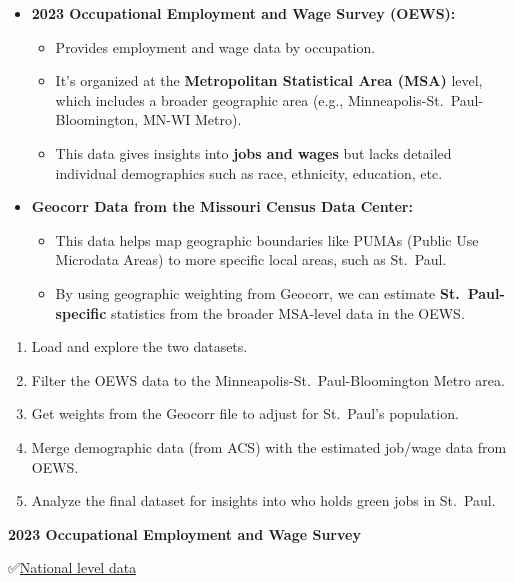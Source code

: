 \documentclass[
  letterpaper,
  DIV=11,
  numbers=noendperiod]{scrartcl}
\providecommand{\tightlist}{%
  \setlength{\itemsep}{0pt}\setlength{\parskip}{0pt}}\usepackage{longtable,booktabs,array}
\begin{document}
\begin{itemize}
\item
  \textbf{2023 Occupational Employment and Wage Survey (OEWS):}

  \begin{itemize}
  \item
    Provides employment and wage data by occupation.
  \item
    It's organized at the \textbf{Metropolitan Statistical Area (MSA)}
    level, which includes a broader geographic area (e.g.,
    Minneapolis-St.~Paul-Bloomington, MN-WI Metro).
  \item
    This data gives insights into \textbf{jobs and wages} but lacks
    detailed individual demographics such as race, ethnicity, education,
    etc.
  \end{itemize}
\item
  \textbf{Geocorr Data from the Missouri Census Data Center:}

  \begin{itemize}
  \item
    This data helps map geographic boundaries like PUMAs (Public Use
    Microdata Areas) to more specific local areas, such as St.~Paul.
  \item
    By using geographic weighting from Geocorr, we can estimate
    \textbf{St.~Paul-specific} statistics from the broader MSA-level
    data in the OEWS.
  \end{itemize}
\end{itemize}

\begin{enumerate}
\def\labelenumi{\arabic{enumi}.}
\tightlist
\item
  Load and explore the two datasets.
\item
  Filter the OEWS data to the Minneapolis-St.~Paul-Bloomington Metro
  area.
\item
  Get weights from the Geocorr file to adjust for St.~Paul's population.
\item
  Merge demographic data (from ACS) with the estimated job/wage data
  from OEWS.
\item
  Analyze the final dataset for insights into who holds green jobs in
  St.~Paul.
\end{enumerate}

\textbf{2023 Occupational Employment and Wage Survey}

✅\href{https://docs.google.com/spreadsheets/d/1I2munGunOJgdI2iWRW7p0BVU0O13r4zb/edit?gid=1944656488\#gid=1944656488}{National
level data}
\end{document}
